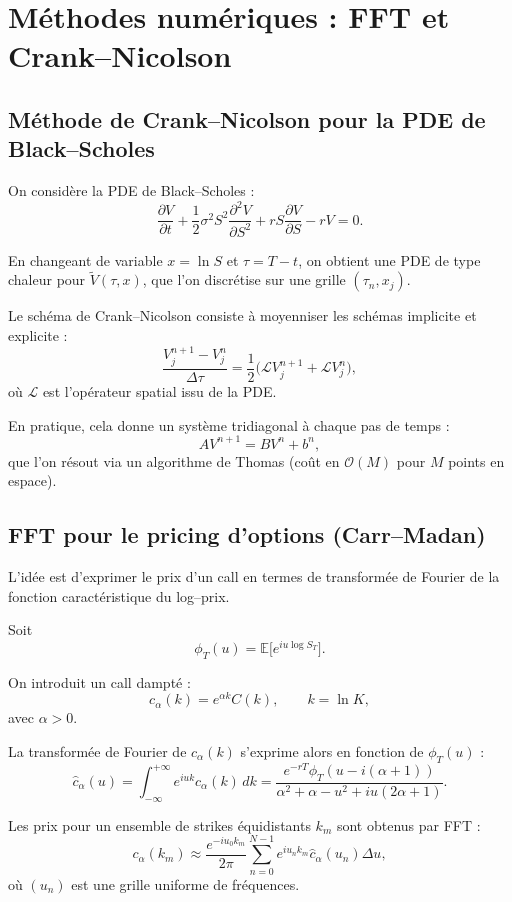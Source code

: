\documentclass[11pt,a4paper]{article}
\newcommand{\1}{\mathbf{1}}
\begin{document}
\section{M\'ethodes num\'eriques : FFT et Crank--Nicolson}
\label{sec:numerical-methods}

\subsection*{M\'ethode de Crank--Nicolson pour la PDE de Black--Scholes}

On consid\`ere la PDE de Black--Scholes :
\[
\frac{\partial V}{\partial t} + \frac12 \sigma^2 S^2 \frac{\partial^2 V}{\partial S^2}
+ r S \frac{\partial V}{\partial S} - r V = 0.
\]

En changeant de variable $x = \ln S$ et $\tau = T-t$, on obtient une PDE de type
chaleur pour $\tilde V(\tau,x)$, que l'on discrétise sur une grille $(\tau_n, x_j)$.

Le schéma de Crank--Nicolson consiste à moyenniser les schémas implicite et explicite :
\[
\frac{V^{n+1}_j - V^n_j}{\Delta \tau}
=
\frac12 \bigl( \mathcal{L}V^{n+1}_j + \mathcal{L}V^{n}_j \bigr),
\]
o\`u $\mathcal{L}$ est l'opérateur spatial issu de la PDE.

En pratique, cela donne un syst\`eme tridiagonal à chaque pas de temps :
\[
A V^{n+1} = B V^n + b^n,
\]
que l'on r\'esout via un algorithme de Thomas (co\^ut en $\mathcal{O}(M)$ pour
$M$ points en espace).

\subsection*{FFT pour le pricing d'options (Carr--Madan)}

L'id\'ee est d'exprimer le prix d'un call en termes de transformée de Fourier
de la fonction caract\'eristique du log--prix.

Soit
\[
\phi_T(u) = \mathbb{E}\bigl[ e^{iu \log S_T} \bigr].
\]

On introduit un call dampt\'e :
\[
c_\alpha(k) = e^{\alpha k} C(k),
\qquad
k = \ln K,
\]
avec $\alpha > 0$.

La transformée de Fourier de $c_\alpha(k)$ s'exprime alors en fonction de
$\phi_T(u)$ :
\[
\hat c_\alpha(u)
=
\int_{-\infty}^{+\infty} e^{i u k} c_\alpha(k)\, dk
=
\frac{e^{-rT} \phi_T(u - i(\alpha+1))}{\alpha^2 + \alpha - u^2 + iu(2\alpha +1)}.
\]

Les prix pour un ensemble de strikes équidistants $k_m$ sont obtenus par FFT :
\[
c_\alpha(k_m)
\approx
\frac{e^{-i u_0 k_m}}{2\pi}
\sum_{n=0}^{N-1} e^{i u_n k_m} \hat c_\alpha(u_n) \Delta u,
\]
o\`u $(u_n)$ est une grille uniforme de fréquences.
\end{document}
